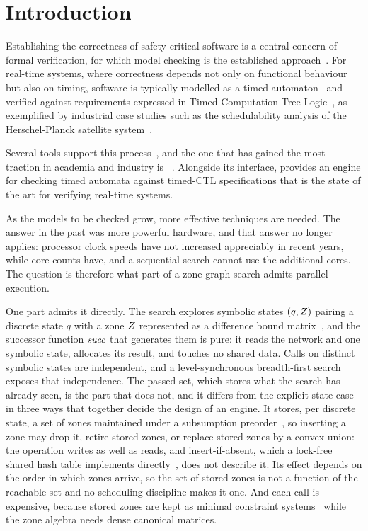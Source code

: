 \section{Introduction}\label{sec:intro}

Establishing the correctness of safety-critical software is a central concern of
formal verification, for which model checking is the established
approach~\cite{Baier08,Clarke99}.  For real-time systems, where correctness
depends not only on functional behaviour but also on timing, software is
typically modelled as a timed automaton~\cite{AlurDill94} and verified against
requirements expressed in Timed Computation Tree
Logic~\cite{AlurCourcoubetisDill90}, as exemplified by industrial case studies
such as the schedulability analysis of the Herschel-Planck satellite
system~\cite{Mikucionis10}.

Several tools support this process~\cite{Bozga98,Herbreteau13}, and the one that
has gained the most traction in academia and industry is
\uppaal{}~\cite{Larsen97,Behrmann04}.  Alongside its interface, \uppaal{}
provides an engine for checking timed automata against timed-CTL specifications
that is the state of the art for verifying real-time systems.

As the models to be checked grow, more effective techniques are needed.  The
answer in the past was more powerful hardware, and that answer no longer applies:
processor clock speeds have not increased appreciably in recent years, while core
counts have, and a sequential search cannot use the additional cores.  The
question is therefore what part of a zone-graph search admits parallel execution.

One part admits it directly.  The search explores symbolic states $(q,Z)$
pairing a discrete state $q$ with a zone $Z$ represented as a difference
bound matrix~\cite{Dill89}, and the successor function $\mathit{succ}$ that generates
them is pure: it reads the network and one symbolic state, allocates its result,
and touches no shared data.  Calls on distinct symbolic states are independent,
and a level-synchronous breadth-first search exposes that independence.  The
passed set, which stores what the search has already seen, is the part that does
not, and it differs from the explicit-state case in three ways that together
decide the design of an engine.  It stores, per discrete state, a set of zones
maintained under a subsumption preorder~\cite{Behrmann06,Herbreteau12}, so
inserting a zone may drop it, retire stored zones, or replace stored zones by a
convex union: the operation writes as well as reads, and insert-if-absent, which
a lock-free shared hash table implements directly~\cite{Laarman10}, does not
describe it.  Its effect depends on the order in which zones arrive, so the set
of stored zones is not a function of the reachable set and no scheduling
discipline makes it one.  And each call is expensive, because stored zones are
kept as minimal constraint systems~\cite{LarsenLPY97} while the zone algebra
needs dense canonical matrices.

